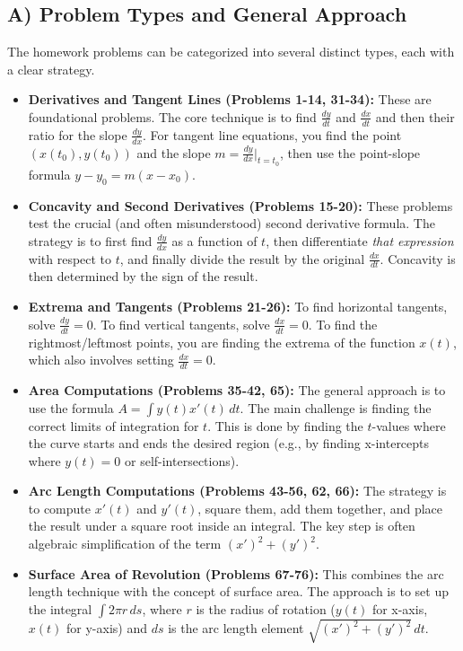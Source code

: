 \documentclass{article}
\begin{document}
\subsection{A) Problem Types and General Approach}
The homework problems can be categorized into several distinct types, each with a clear strategy.
\begin{itemize}
    \item \textbf{Derivatives and Tangent Lines (Problems 1-14, 31-34):} These are foundational problems. The core technique is to find $\frac{dy}{dt}$ and $\frac{dx}{dt}$ and then their ratio for the slope $\frac{dy}{dx}$. For tangent line equations, you find the point $(x(t_0), y(t_0))$ and the slope $m = \frac{dy}{dx}|_{t=t_0}$, then use the point-slope formula $y-y_0 = m(x-x_0)$.
    \item \textbf{Concavity and Second Derivatives (Problems 15-20):} These problems test the crucial (and often misunderstood) second derivative formula. The strategy is to first find $\frac{dy}{dx}$ as a function of $t$, then differentiate \textit{that expression} with respect to $t$, and finally divide the result by the original $\frac{dx}{dt}$. Concavity is then determined by the sign of the result.
    \item \textbf{Extrema and Tangents (Problems 21-26):} To find horizontal tangents, solve $\frac{dy}{dt}=0$. To find vertical tangents, solve $\frac{dx}{dt}=0$. To find the rightmost/leftmost points, you are finding the extrema of the function $x(t)$, which also involves setting $\frac{dx}{dt}=0$.
    \item \textbf{Area Computations (Problems 35-42, 65):} The general approach is to use the formula $A = \int y(t) x'(t) \, dt$. The main challenge is finding the correct limits of integration for $t$. This is done by finding the $t$-values where the curve starts and ends the desired region (e.g., by finding x-intercepts where $y(t)=0$ or self-intersections).
    \item \textbf{Arc Length Computations (Problems 43-56, 62, 66):} The strategy is to compute $x'(t)$ and $y'(t)$, square them, add them together, and place the result under a square root inside an integral. The key step is often algebraic simplification of the term $(x')^2 + (y')^2$.
    \item \textbf{Surface Area of Revolution (Problems 67-76):} This combines the arc length technique with the concept of surface area. The approach is to set up the integral $\int 2\pi r \, ds$, where $r$ is the radius of rotation ($y(t)$ for x-axis, $x(t)$ for y-axis) and $ds$ is the arc length element $\sqrt{(x')^2 + (y')^2} \, dt$.
\end{itemize}
\end{document}
